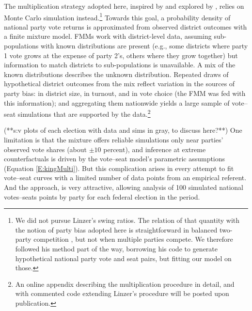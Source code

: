 \documentclass[letter,12pt]{article}
\begin{document}
The multiplication strategy adopted here, inspired by \citet{linzerSeatVoteElasticity2012} and explored by \citet{marquez2014mixSwingBlog}, relies on Monte Carlo simulation instead.\footnote{We did not pursue Linzer's swing ratios. The relation of that quantity with the notion of party bias adopted here is straightforward in balanced two-party competition \citep[see][:410]{linzerSeatVoteElasticity2012}, but not when multiple parties compete. We therefore followed his method part of the way, borrowing his code to generate hypothetical national party vote and seat pairs, but fitting our model on those.} Towards this goal, a probability density of national party vote returns is approximated from observed district outcomes with a finite mixture model. FMMs work with district-level data, assuming sub-populations with known distributions are present (e.g., some districts where party 1 vote grows at the expense of party 2's, others where they grow together) but information to match districts to sub-populations is unavailable. A mix of the known distributions describes the unknown distribution. Repeated draws of hypothetical district outcomes from the mix reflect variation in the sources of party bias: in district size, in turnout, and in vote choice (the FMM was fed with this information); and aggregating them nationwide yields a large sample of vote--seat simulations that are supported by the data.\footnote{An online appendix describing the multiplication procedure in detail, and with commented code extending Linzer's procedure will be posted upon publication.} 

(**s:v plots of each election with data and sims in gray, to discuss here?**) One limitation is that the mixture offers reliable simulations only near parties' observed vote shares (about $\pm10$ percent), and inference at extreme counterfactuals is driven by the vote--seat model's parametric assumptions (Equation \ref{E:kingMulti}). But this complication arises in every attempt to fit vote--seat curves with a limited number of data points from an empirical referent. And the approach, is very attractive, allowing analysis of 100 simulated national votes--seats points by party for each federal election in the period.  

\end{document}
